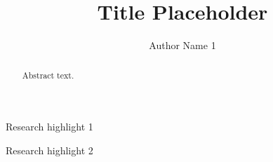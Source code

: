 \documentclass[preprint,11pt,authoryear]{elsarticle}
\begin{document}
\begin{frontmatter}



\title{Title Placeholder} %


\author{Author Name 1} %


\begin{abstract}
Abstract text.
\end{abstract}

\begin{graphicalabstract}
\end{graphicalabstract}

\begin{highlights}
\item Research highlight 1
\item Research highlight 2
\end{highlights}

\begin{keyword}



\end{keyword}

\end{frontmatter}
\end{document}
